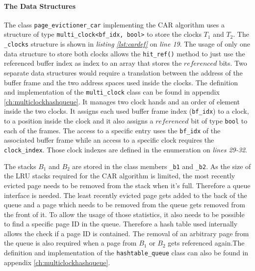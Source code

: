 \paragraph{The Data Structures}

\begin{@empty}
	\lstset{
		language = [ISO]C++,
		style = basic
	}
	\begin{code}[ht!]
		\caption{Data Structures of the Class \lstinline{page_evictioner_car}} \label{lst:cardef}
		
	\end{code}
\end{@empty}

	The class \lstinline{page_evictioner_car} implementing the CAR algorithm uses a structure of type \lstinline{multi_clock<bf_idx, bool>} to store the clocks $T_1$ and $T_2$. The \lstinline{_clocks} structure is shown in \emph{listing \ref{lst:cardef}} on \emph{line 19}. The usage of only one data structure to store both clocks allows the \lstinline{hit_ref()} method to just use the referenced buffer index as index to an array that stores the $referenced$ bits. Two separate data structures would require a translation between the address of the buffer frame and the two address spaces used inside the clocks. The definition and implementation of the \lstinline{multi_clock} class can be found in appendix \ref{ch:multiclockhashqueue}. It manages two clock hands and an order of element inside the two clocks. It assigns each used buffer frame index (\lstinline{bf_idx}) to a clock, to a position inside the clock and it also assigns a $referenced$ bit of type \lstinline{bool} to each of the frames. The access to a specific entry uses the \lstinline{bf_idx} of the associated buffer frame while an access to a specific clock requires the \lstinline{clock_index}. Those clock indexes are defined in the enumeration on \emph{lines 29-32}.
	
	The stacks $B_1$ and $B_2$ are stored in the class members \lstinline{_b1} and \lstinline{_b2}. As the size of the LRU stacks required for the CAR algorithm is limited, the most recently evicted page needs to be removed from the stack when it's full. Therefore a queue interface is needed. The least recently evicted page gets added to the back of the queue and a page which needs to be removed from the queue gets removed from the front of it. To allow the usage of those statistics, it also needs to be possible to find a specific page ID in the queue. Therefore a hash table used internally allows the check if a page ID is contained. The removal of an arbitrary page from the queue is also required when a page from $B_1$ or $B_2$ gets referenced again.The definition and implementation of the \lstinline{hashtable_queue} class can also be found in appendix \ref{ch:multiclockhashqueue}.
	
